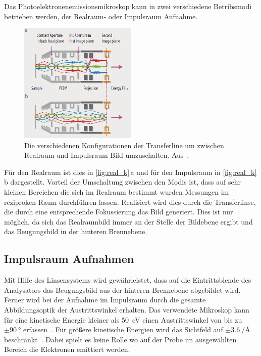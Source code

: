        Das Photoelektronenemissionsmikroskop kann in zwei verschiedene Betribsmodi betrieben werden, der Realraum- oder Impulsraum Aufnahme.
        \begin{figure}
            \centering
            \includegraphics[width=0.5\textwidth]{Real_k.PNG}
            \caption{Die verschiedenen Konfigurationen der Transferline um zwischen Realraum und Impulsraum Bild umzuschalten. Aus~\cite{Focus}.}
            \label{fig:real_k}
        \end{figure}
        Für den Realraum ist dies in \autoref{fig:real_k}\,a und für den Impulsraum in \autoref{fig:real_k}\,b dargestellt.
        Vorteil der Umschaltung zwischen den Modis ist, dass auf sehr kleinen Bereichen die sich im Realraum bestimmt wurden Messungen im reziproken Raum durchführen lassen.
        Realisiert wird dies durch die Transferlinse, die durch eine entsprechende Fokussierung das Bild generiert.
        Dies ist nur möglich, da sich das Realraumbild immer an der Stelle der Bildebene ergibt und das Beugungsbild in der hinteren Brennebene.
        

        \subsection{Impulsraum Aufnahmen}
            Mit Hilfe des Linsensystems wird gewährleistet, dass auf die Eintrittsblende des Analysators das Beugungsbild aus der hinteren Brennebene abgebildet wird.
            Ferner wird bei der Aufnahme im Impulsraum durch die gesamte Abbildungsoptik der Austrittswinkel erhalten.
            Das verwendete Mikroskop kann für eine kinetische Energie kleiner als \SI{50}{\electronvolt} einen Austrittswinkel von bis zu $\pm\SI{90}{\degree}$ erfassen~\cite{SPECS-MM}.
            Für größere kinetische Energien wird das Sichtfeld auf $\pm\SI[per-mode=reciprocal]{3.6}{\per\angstrom}$ beschränkt~\cite{SPECS-MM}.
            Dabei spielt es keine Rolle wo auf der Probe im ausgewählten Bereich die Elektronen emittiert werden.

